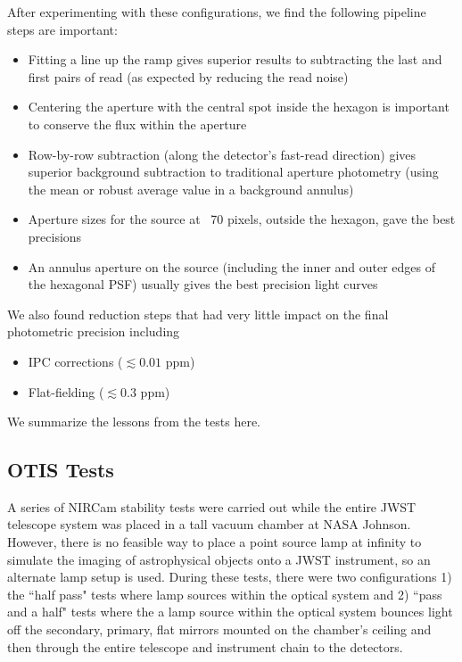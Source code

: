 \documentclass{aastex62}
\begin{document}
{After experimenting with these configurations, we find the following pipeline steps are important:
\begin{itemize}
	\item Fitting a line up the ramp gives superior results to subtracting the last and first pairs of read (as expected by reducing the read noise)
	\item Centering the aperture with the central spot inside the hexagon is important to conserve the flux within the aperture
	\item Row-by-row subtraction (along the detector's fast-read direction) gives superior background subtraction to traditional aperture photometry (using the mean or robust average value in a background annulus)
	\item Aperture sizes for the source at ~70 pixels, outside the hexagon, gave the best precisions
	\item An annulus aperture on the source (including the inner and outer edges of the hexagonal PSF) usually gives the best precision light curves
\end{itemize}

We also found reduction steps that had very little impact on the final photometric precision including
\begin{itemize}
	\item IPC corrections ($\lesssim 0.01$ ppm)
	\item Flat-fielding ($\lesssim 0.3$ ppm)
\end{itemize}
We summarize the lessons from the tests here.

\subsection{OTIS Tests}

A series of NIRCam stability tests were carried out while the entire JWST telescope system was placed in a tall vacuum chamber at NASA Johnson.
However, there is no feasible way to place a point source lamp at infinity to simulate the imaging of astrophysical objects onto a JWST instrument, so an alternate lamp setup is used.
During these tests, there were two configurations 1) the ``half pass" tests where lamp sources within the optical system and 2) ``pass and a half" tests where the a lamp source within the optical system bounces light off the secondary, primary, flat mirrors mounted on the chamber's ceiling and then through the entire telescope and instrument chain to the detectors.

}
\end{document}
